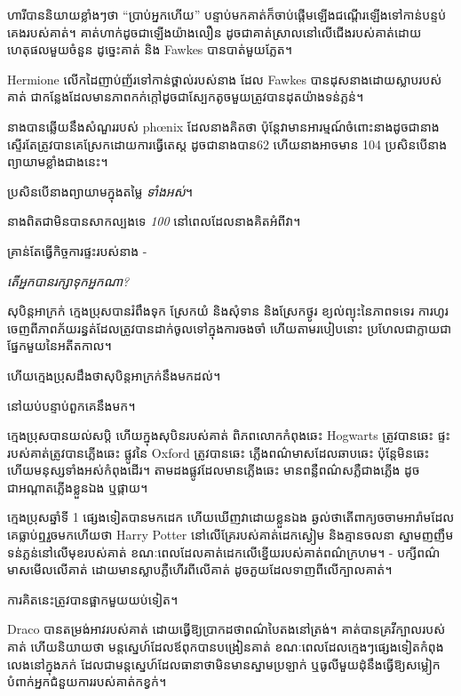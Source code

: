 {ហារីបាននិយាយខ្លាំងៗថា “ប្រាប់អ្នកហើយ” បន្ទាប់មកគាត់ក៏ចាប់ផ្តើមឡើងជណ្តើរឡើងទៅកាន់បន្ទប់គេងរបស់គាត់។ គាត់ហាក់ដូចជាឡើងយ៉ាងលឿន ដូចជាគាត់ស្រាលនៅលើជើងរបស់គាត់ដោយហេតុផលមួយចំនួន ដូច្នេះគាត់ និង Fawkes បានបាត់មួយភ្លែត។

Hermione លើកដៃញាប់ញ័រទៅកាន់ថ្ពាល់របស់នាង ដែល Fawkes បានដុសនាងដោយស្លាបរបស់គាត់ ជាកន្លែងដែលមានភាពកក់ក្តៅដូចជាស្បែកតូចមួយត្រូវបានដុតយ៉ាងទន់ភ្លន់។

នាង​បាន​ឆ្លើយ​នឹង​សំណួរ​របស់ phœnix ដែល​នាង​គិត​ថា ប៉ុន្តែ​វា​មាន​អារម្មណ៍​ចំពោះ​នាង​ដូចជា​នាង​ស្ទើរតែ​ត្រូវ​បាន​គេ​ស្រែក​ដោយ​ការ​ធ្វើ​តេស្ដ ដូចជា​នាង​បាន​62 ហើយ​នាង​អាច​មាន 104 ប្រសិន​បើ​នាង​ព្យាយាម​ខ្លាំង​ជាង​នេះ។

ប្រសិនបើនាងព្យាយាមក្នុងតម្លៃ \emph{ទាំងអស់}។

នាងពិតជាមិនបានសាកល្បងទេ \emph{100} នៅពេលដែលនាងគិតអំពីវា។

គ្រាន់តែធ្វើកិច្ចការផ្ទះរបស់នាង -

\emph{តើអ្នកបានរក្សាទុកអ្នកណា?}


សុបិន្តអាក្រក់ ក្មេងប្រុសបានរំពឹងទុក ស្រែកយំ និងសុំទាន និងស្រែកថ្ងូរ ខ្យល់ព្យុះនៃភាពទទេរ ការហូរចេញពីភាពភ័យរន្ធត់ដែលត្រូវបានដាក់ចូលទៅក្នុងការចងចាំ ហើយតាមរបៀបនោះ ប្រហែលជាក្លាយជាផ្នែកមួយនៃអតីតកាល។

ហើយក្មេងប្រុសដឹងថាសុបិន្តអាក្រក់នឹងមកដល់។

នៅយប់បន្ទាប់ពួកគេនឹងមក។

ក្មេងប្រុសបានយល់សប្តិ ហើយក្នុងសុបិនរបស់គាត់ ពិភពលោកកំពុងឆេះ Hogwarts ត្រូវបានឆេះ ផ្ទះរបស់គាត់ត្រូវបានភ្លើងឆេះ ផ្លូវនៃ Oxford ត្រូវបានឆេះ ភ្លើងពណ៌មាសដែលឆាបឆេះ ប៉ុន្តែមិនឆេះ ហើយមនុស្សទាំងអស់កំពុងដើរ។ តាមដងផ្លូវដែលមានភ្លើងឆេះ មានពន្លឺពណ៌សភ្លឺជាងភ្លើង ដូចជាអណ្តាតភ្លើងខ្លួនឯង ឬផ្កាយ។

ក្មេងប្រុសឆ្នាំទី 1 ផ្សេងទៀតបានមកដេក ហើយឃើញវាដោយខ្លួនឯង ឆ្ងល់ថាតើពាក្យចចាមអារ៉ាមដែលគេធ្លាប់ឮរួចមកហើយថា Harry Potter នៅលើគ្រែរបស់គាត់ដេកស្ងៀម និងគ្មានចលនា ស្នាមញញឹមទន់ភ្លន់នៅលើមុខរបស់គាត់ ខណៈពេលដែលគាត់ដេកលើខ្នើយរបស់គាត់ពណ៌ក្រហម។ - បក្សី​ពណ៌​មាស​មើល​លើ​គាត់ ដោយ​មាន​ស្លាប​ភ្លឺ​ហើរ​ពីលើ​គាត់ ដូច​ភួយ​ដែល​ទាញ​ពីលើ​ក្បាល​គាត់។

ការ​គិត​នេះ​ត្រូវ​បាន​ផ្អាក​មួយ​យប់​ទៀត។


Draco បាន​តម្រង់​អាវ​របស់​គាត់ ដោយ​ធ្វើ​ឱ្យ​ប្រាកដ​ថា​ពណ៌​បៃតង​នៅ​ត្រង់។ គាត់បានគ្រវីក្បាលរបស់គាត់ ហើយនិយាយថា មន្តស្នេហ៍ដែលឪពុកបានបង្រៀនគាត់ ខណៈពេលដែលក្មេងៗផ្សេងទៀតកំពុងលេងនៅក្នុងភក់ ដែលជាមន្តស្នេហ៍ដែលធានាថាមិនមានស្នាមប្រឡាក់ ឬធូលីមួយដុំនឹងធ្វើឱ្យសម្លៀកបំពាក់អ្នកជំនួយការរបស់គាត់កខ្វក់។

}
